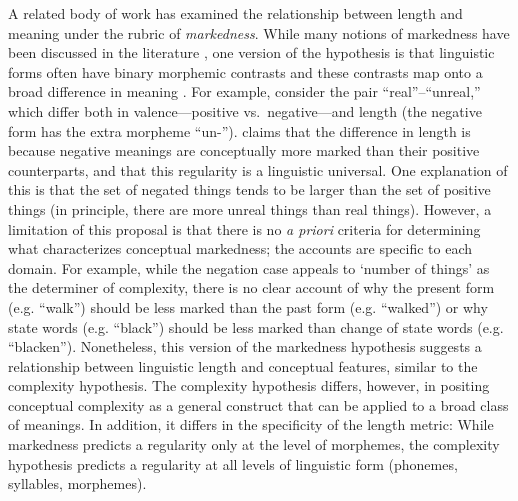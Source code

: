\documentclass[man]{apa2}
\begin{document}
A related body of work has examined the relationship between length and meaning under the rubric of {\it markedness}. While many notions of markedness have been discussed in the literature \cite{haspelmath2006against}, one version of the hypothesis is that linguistic forms often have binary morphemic contrasts and these contrasts map onto a broad difference in meaning \cite{greenberg1966}. For example, consider the pair ``real''--``unreal,'' which differ both in valence---positive vs.\ negative---and length (the negative form has the extra morpheme ``un-'').  claims that the difference in length is because negative meanings are conceptually more marked than their positive counterparts, and that this regularity is a linguistic universal. One explanation of this is that the set of negated things tends to be larger than the set of positive things (in principle, there are more unreal things than real things). However, a limitation of this proposal is that there is no {\it a priori} criteria for determining what characterizes conceptual markedness; the accounts are specific to each domain. For example, while the negation case appeals to `number of things' as the determiner of complexity, there is no clear account of why the present form (e.g. ``walk'') should be less marked than the past  form (e.g. ``walked'') or why state words (e.g. ``black'') should be less marked than change of state words (e.g. ``blacken''). Nonetheless, this version of the markedness hypothesis suggests a relationship between linguistic length and conceptual features, similar to the complexity hypothesis. The complexity hypothesis differs, however, in positing conceptual complexity as a general construct that can be applied to a broad class of meanings. In addition, it differs in the specificity of the length metric: While markedness predicts a regularity only at the level of morphemes, the complexity hypothesis predicts a regularity at all levels of linguistic form (phonemes, syllables, morphemes). 




 
\end{document}
